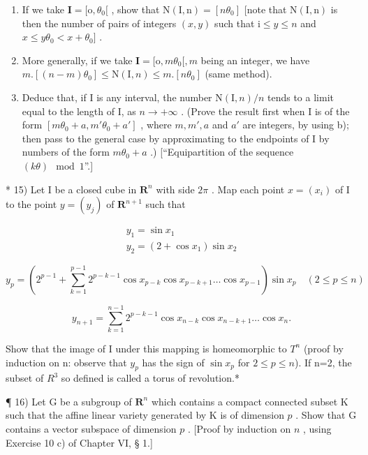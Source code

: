 \begin{enumerate}
\def\labelenumi{\alph{enumi})}
\item
  If we take \(\mathbf{I} = [\mathrm{o},\theta_0[\) , show that \(\mathrm{N(I,n)} = [n\theta_0]\) {[}note that \(\mathrm{N(I,n)}\) is then the number of pairs of integers \((x,y)\) such that \(\mathrm{i}\leqslant y\leqslant n\) and \(x\leqslant y\theta_0 < x + \theta_0]\) .
\item
  More generally, if we take \(\mathbf{I} = [\mathrm{o}, m\theta_0[, m\) being an integer, we have \(m. [(n - m)\theta_0] \leqslant \mathrm{N}(\mathrm{I}, n) \leqslant m. [n\theta_0]\) (same method).
\item
  Deduce that, if I is any interval, the number \(\mathrm{N}(\mathrm{I}, n)/n\) tends to a limit equal to the length of I, as \(n \to +\infty\) . (Prove the result first when I is of the form \([m\theta_{0} + a, m'\theta_{0} + a']\) , where \(m, m', a\) and \(a'\) are integers, by using b); then pass to the general case by approximating to the endpoints of I by numbers of the form \(m\theta_{0} + a\) .) {[}``Equipartition of the sequence \((k\theta) \mod 1\)''.{]}
\end{enumerate}

* 15) Let I be a closed cube in \(\mathbf{R}^n\) with side \(2\pi\) . Map each point \(x = (x_i)\) of I to the point \(y = (y_j)\) of \(\mathbf{R}^{n+1}\) such that

\[
\begin{array}{l} y _ {1} = \sin x _ {1} \\ y _ {2} = (2 + \cos x _ {1}) \sin x _ {2} \end{array}
\]

\[
y _ {p} = \left(2 ^ {p - 1} + \sum_ {k = 1} ^ {p - 1} 2 ^ {p - k - 1} \cos x _ {p - k} \cos x _ {p - k + 1} \dots \cos x _ {p - 1}\right) \sin x _ {p} \quad (2 \leqslant p \leqslant n)
\]

\[
y _ {n + 1} = \sum_ {k = 1} ^ {n - 1} 2 ^ {p - k - 1} \cos x _ {n - k} \cos x _ {n - k + 1} \dots \cos x _ {n}.
\]

Show that the image of I under this mapping is homeomorphic to \(T^{n}\) (proof by induction on n: observe that \(y_{p}\) has the sign of \(\sin x_{p}\) for \(2 \leqslant p \leqslant n\)). If n=2, the subset of \(R^{3}\) so defined is called a torus of revolution.*

¶ 16) Let G be a subgroup of \(\mathbf{R}^n\) which contains a compact connected subset K such that the affine linear variety generated by K is of dimension \(p\) . Show that G contains a vector subspace of dimension \(p\) . {[}Proof by induction on \(n\) , using Exercise 10 c) of Chapter VI, § 1.{]}

